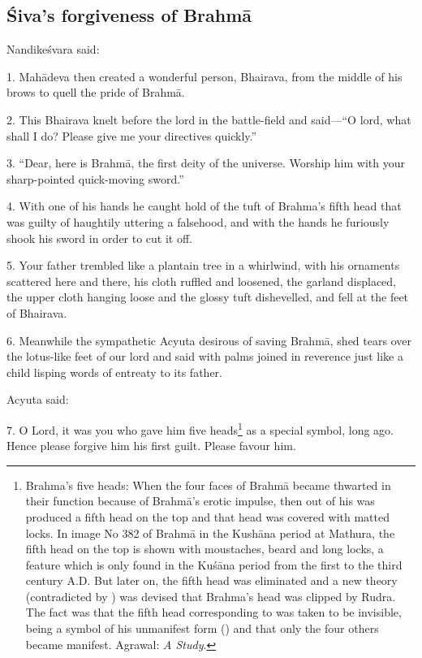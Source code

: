 \subsection{Śiva’s forgiveness of Brahmā}

Nandikeśvara said:

1. Mahādeva then created a wonderful person, Bhairava, from the middle of his
brows to quell the pride of Brahmā.

2. This Bhairava knelt before the lord in the battle-field and said—“O lord,
what shall I do? Please give me your directives quickly.”

3. “Dear, here is Brahmā, the first deity of the universe. Worship him with your
sharp-pointed quick-moving sword.”

4. With one of his hands he caught hold of the tuft of Brahma’s fifth head that
was guilty of haughtily uttering a falsehood, and with the hands he furiously
shook his sword in order to cut it off.

5. Your father trembled like a plantain tree in a whirlwind, with his ornaments
scattered here and there, his cloth ruffled and loosened, the garland displaced,
the upper cloth hanging loose and the glossy tuft dishevelled, and fell at
the feet of Bhairava.

6. Meanwhile the sympathetic Acyuta desirous of saving Brahmā, shed tears over
the lotus-like feet of our lord and said with palms joined in reverence just
like a child lisping words of entreaty to its father.

Acyuta said:

7. O Lord, it was you who gave him five heads\footnote{Brahma’s five heads: When
the four faces of Brahmā became thwarted in their function because of Brahmā’s
erotic impulse, then out of his  was produced a fifth head on the top
and that head was covered with matted locks. In image No 382 of Brahmā in
the Kushāna period at Mathura, the fifth head on the top is shown with
moustaches, beard and long locks, a feature which is only found in the Kuśāna
period from the first to the third century A.D. But later on, the fifth head was
eliminated and a new theory (contradicted by ) was devised
that Brahma’s head was clipped by Rudra. The fact was that the fifth head
corresponding to  was taken to be invisible, being a symbol of his
unmanifest form () and that only the four others became
manifest. Agrawal: \emph{A Study}.} as a special symbol, long ago.
Hence please forgive him his first guilt. Please favour him.

